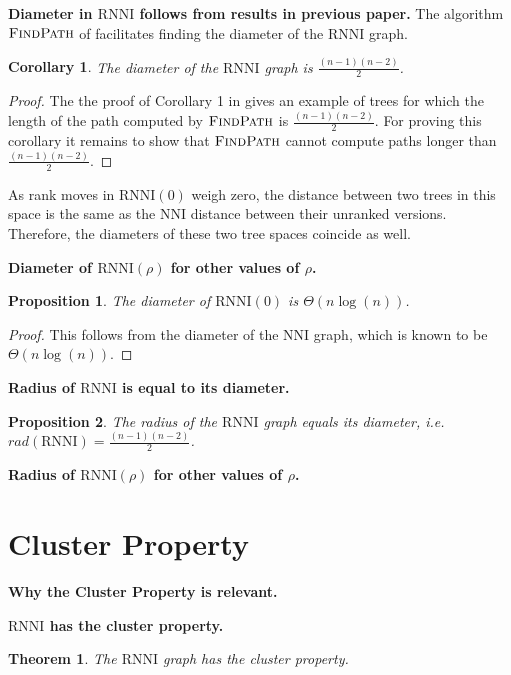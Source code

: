 \documentclass[11pt]{amsart}
\newtheorem{proposition}{Proposition}
\newtheorem{theorem}{Theorem}
\newtheorem{corollary}{Corollary}
\newcommand{\rnni}{\mathrm{RNNI}}
\newcommand{\findpath}{\textsc{FindPath}}
\newcommand{\nni}{\mathrm{NNI}}
\newcommand{\rad}{\mathit{rad}}
\newcommand{\summary}[1]{\textbf{#1}} %
\begin{document}
\summary{Diameter in $\rnni$ follows from results in previous paper.}
The algorithm $\findpath$ of \autocite{collienne2020computing} facilitates finding the diameter of the $\rnni$ graph. 
\begin{corollary}
	The diameter of the $\rnni$ graph is $\frac{(n-1)(n-2)}{2}$.
\end{corollary}

\begin{proof}
	The the proof of Corollary 1 in \autocite{collienne2020computing} gives an example of trees for which the length of the path computed by $\findpath$ is $\frac{(n-1)(n-2)}{2}$.
	For proving this corollary it remains to show that $\findpath$ cannot compute paths longer than $\frac{(n-1)(n-2)}{2}$.
\end{proof}

As rank moves in $\rnni(0)$ weigh zero, the distance between two trees in this space is the same as the $\nni$ distance between their unranked versions.
Therefore, the diameters of these two tree spaces coincide as well.

\summary{Diameter of $\rnni(\rho)$ for other values of $\rho$.}
\begin{proposition}
	The diameter of $\rnni(0)$ is $\Theta(n \log(n))$.
\end{proposition}

\begin{proof}
 This follows from the diameter of the $\nni$ graph, which is known \autocite{Semple2003-nj} to be $\Theta(n \log(n))$.
\end{proof}

\summary{Radius of $\rnni$ is equal to its diameter.}
\begin{proposition}
	The radius of the $\rnni$ graph equals its diameter, i.e. $\rad(\rnni) = \frac{(n-1)(n-2)}{2}$.
\end{proposition}

\summary{Radius of $\rnni(\rho)$ for other values of $\rho$.}


\section{Cluster Property}

\summary{Why the Cluster Property is relevant.}

\summary{$\rnni$ has the cluster property.}
\begin{theorem}
	The $\rnni$ graph has the cluster property.
\end{theorem}
\end{document}
